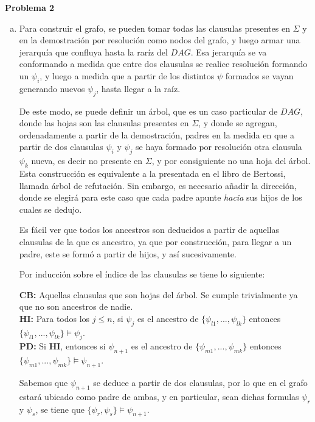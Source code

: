 \documentclass[letterpaper,10pt]{article}
\begin{document}
\textbf{Problema 2}

\begin{enumerate}[a)]

    \item Para construir el grafo, se pueden tomar todas las clausulas presentes en $\Sigma$ y en la demostración por resolución como nodos del grafo, y luego armar una jerarquía que confluya hasta la raríz del $DAG$. Esa jerarquía se va conformando a medida que entre dos clausulas se realice resolución formando un $\psi_i$, y luego a medida que a partir de los distintos $\psi$ formados se vayan generando nuevos $\psi_j$, hasta llegar a la raíz.

    De este modo, se puede definir un árbol, que es un caso particular de $DAG$, donde las hojas son las clausulas presentes en $\Sigma$, y donde se agregan, ordenadamente a partir de la demostración, padres en la medida en que a partir de dos clausulas $\psi_i$ y $\psi_j$ se haya formado por resolución otra clausula $\psi_k$ nueva, es decir no presente en $\Sigma$, y por consiguiente no una hoja del árbol. Esta construcción es equivalente a la presentada en el libro de Bertossi, llamada árbol de refutación. Sin embargo, es necesario añadir la dirección, donde se elegirá para este caso que cada padre apunte \textit{hacia} sus hijos de los cuales se dedujo.

    Es fácil ver que todos los ancestros son deducidos a partir de aquellas clausulas de la que es ancestro, ya que por construcción, para llegar a un padre, este se formó a partir de hijos, y así sucesivamente.

    Por inducción sobre el índice de las clausulas se tiene lo siguiente:

    \textbf{CB:} Aquellas clausulas que son hojas del árbol. Se cumple trivialmente ya que no son ancestros de nadie.\\
    \textbf{HI:} Para todos los $j \le n$, si $\psi_j$ es el ancestro de $\{\psi_{l1},...,\psi_{lk}\}$ entonces $\{\psi_{l1},...,\psi_{lk}\} \models \psi_j$.\\
    \textbf{PD:} Si \textbf{HI}, entonces si $\psi_{n+1}$ es el ancestro de $\{\psi_{m1},...,\psi_{mk}\}$ entonces $\{\psi_{m1},...,\psi_{mk}\} \models \psi_{n+1}$.

    Sabemos que $\psi_{n+1}$ se deduce a partir de dos clausulas, por lo que en el grafo estará ubicado como padre de ambas, y en particular, sean dichas formulas $\psi_r$ y $\psi_s$, se tiene que $\{\psi_r, \psi_s\} \models \psi_{n+1}$.


\end{enumerate}
\end{document}
